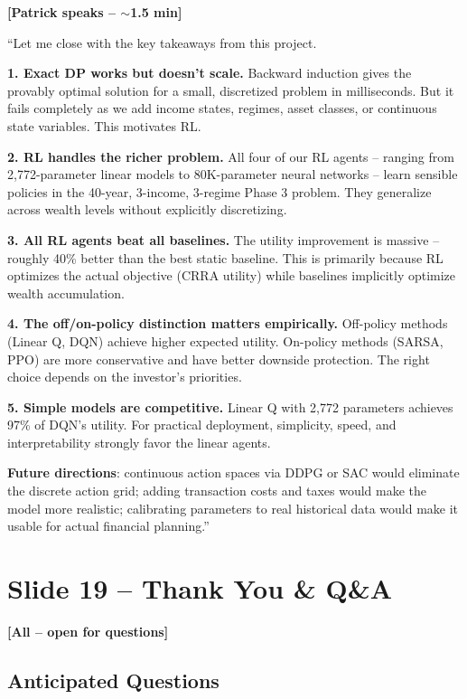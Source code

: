 \documentclass[11pt, letterpaper]{article}
\begin{document}
\textbf{[Patrick speaks -- $\sim$1.5 min]}

``Let me close with the key takeaways from this project.

\textbf{1. Exact DP works but doesn't scale.} Backward induction gives the provably optimal solution for a small, discretized problem in milliseconds. But it fails completely as we add income states, regimes, asset classes, or continuous state variables. This motivates RL.

\textbf{2. RL handles the richer problem.} All four of our RL agents -- ranging from 2,772-parameter linear models to 80K-parameter neural networks -- learn sensible policies in the 40-year, 3-income, 3-regime Phase 3 problem. They generalize across wealth levels without explicitly discretizing.

\textbf{3. All RL agents beat all baselines.} The utility improvement is massive -- roughly 40\% better than the best static baseline. This is primarily because RL optimizes the actual objective (CRRA utility) while baselines implicitly optimize wealth accumulation.

\textbf{4. The off/on-policy distinction matters empirically.} Off-policy methods (Linear Q, DQN) achieve higher expected utility. On-policy methods (SARSA, PPO) are more conservative and have better downside protection. The right choice depends on the investor's priorities.

\textbf{5. Simple models are competitive.} Linear Q with 2,772 parameters achieves 97\% of DQN's utility. For practical deployment, simplicity, speed, and interpretability strongly favor the linear agents.

\textbf{Future directions}: continuous action spaces via DDPG or SAC would eliminate the discrete action grid; adding transaction costs and taxes would make the model more realistic; calibrating parameters to real historical data would make it usable for actual financial planning.''

\section{Slide 19 -- Thank You \& Q\&A}

\textbf{[All -- open for questions]}

\subsection*{Anticipated Questions}
\end{document}
